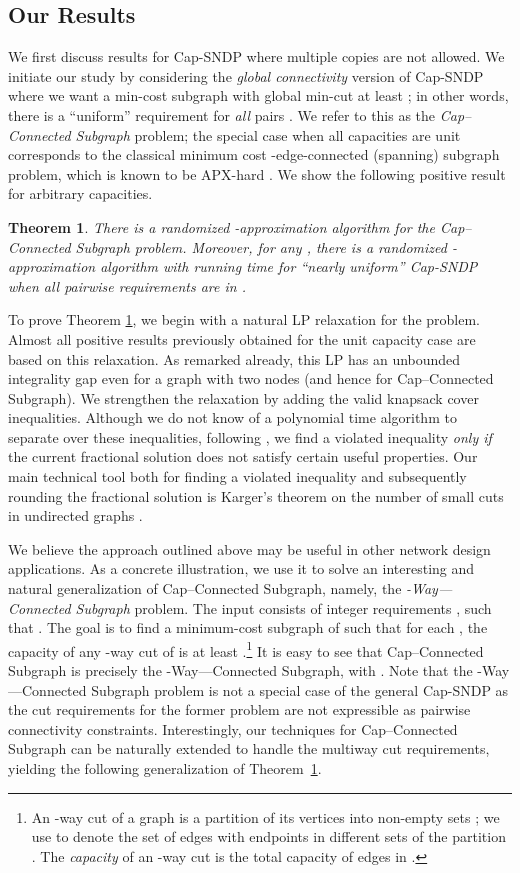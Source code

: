 \documentclass[11pt]{article}
\newcounter{thm0Rcopies}
\newcounter{thm_saved}
\newtheorem{theorem}[lemma]{Theorem}
\def\kway{-Way---Connected Subgraph\xspace}
\def\capR{Cap--Connected Subgraph\xspace}
\begin{document}
\subsection{Our Results}
We first discuss results for Cap-SNDP where multiple copies are not
allowed.  We initiate our study by considering the {\em global
  connectivity} version of Cap-SNDP where we want a min-cost subgraph
with global min-cut at least ; in other words, there is a
``uniform'' requirement  for {\em all} pairs . We
refer to this as the {\em \capR} problem; the special case when all
capacities are unit corresponds to the classical minimum cost
-edge-connected (spanning) subgraph problem, which is known to be APX-hard \cite{Fer}.  We show the following positive
result for arbitrary capacities.

\begin{theorem}\label{thm:uniform}
  There is a randomized -approximation algorithm for the
  \capR problem.  Moreover, for any , there is a
  randomized -approximation algorithm with running
  time  for ``nearly uniform'' Cap-SNDP when all
  pairwise requirements are in .
\end{theorem}

To prove Theorem \ref{thm:uniform}, we begin with a natural LP
relaxation for the problem. Almost all positive results previously
obtained for the unit capacity case are based on this relaxation. As
remarked already, this LP has an unbounded integrality gap even for a
graph with two nodes (and hence for \capR). We strengthen the
relaxation by adding the valid knapsack cover inequalities.  Although
we do not know of a polynomial time algorithm to separate over these
inequalities, following \cite{CFLP}, we find a violated inequality
{\em only if} the current fractional solution does not satisfy certain
useful properties. Our main technical tool both for finding a violated
inequality and subsequently rounding the fractional solution is
Karger's theorem on the number of small cuts in undirected graphs
\cite{Karger}.

We believe the approach outlined above may be useful in other network
design applications. As a concrete illustration, we use it to solve an
interesting and natural generalization of \capR, namely, the {\em
  \kway} problem.  The input consists of  integer requirements
, such that . The goal is to find a minimum-cost subgraph  of  such
that for each , the capacity of any -way cut
of  is at least .\footnote{An -way cut  of a graph
   is a partition of its vertices into  non-empty sets
  ; we use  to denote the set of edges
  with endpoints in different sets of the partition .  The
  \emph{capacity} of an -way cut  is the total capacity of
  edges in .} It is easy to see that \capR is precisely
the \kway, with .  Note that the \kway problem is not a special
case of the general Cap-SNDP as the cut requirements for the former
problem are not expressible as pairwise connectivity constraints.
Interestingly, our techniques for \capR can be naturally extended to
handle the multiway cut requirements, yielding the following
generalization of Theorem~\ref{thm:uniform}.
\end{document}
